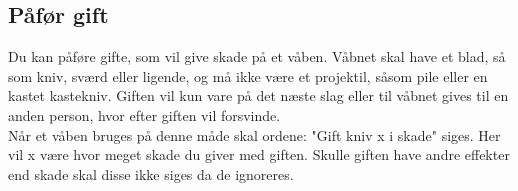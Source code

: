\subsection{Påfør gift}
Du kan påføre gifte, som vil give skade på et våben. Våbnet skal have et blad, så som kniv, sværd eller ligende, og må ikke være et projektil, såsom pile eller en kastet kastekniv. Giften vil kun vare på det næste slag eller til våbnet gives til en anden person, hvor efter giften vil forsvinde.\\
Når et våben bruges på denne måde skal ordene: "Gift kniv x i skade" siges. Her vil x være hvor meget skade du giver med giften. Skulle giften have andre effekter end skade skal disse ikke siges da de ignoreres.